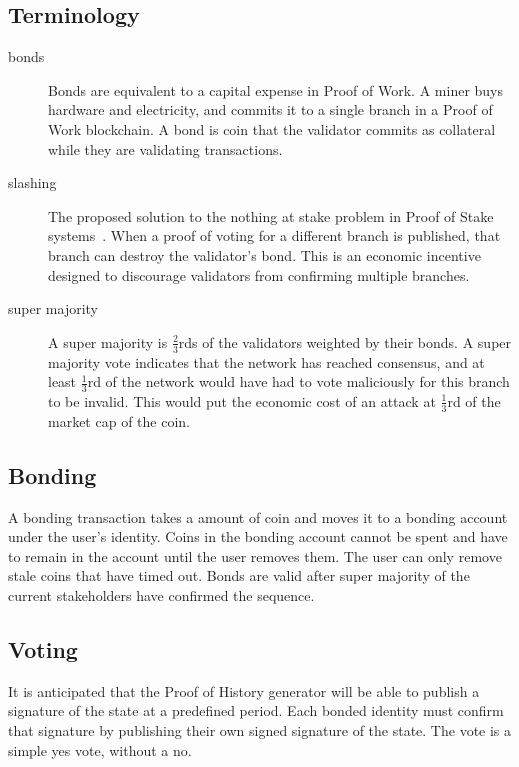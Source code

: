 \documentclass[12pt]{article}
\begin{document}
\subsection{Terminology}
\begin{description}

\item[bonds]
Bonds are equivalent to a capital expense in Proof of Work. A miner buys hardware and electricity, and commits it to a single branch in a Proof of Work blockchain. A bond is coin that the validator commits as collateral while they are validating transactions.

\item[slashing]

The proposed solution to the nothing at stake problem in Proof of Stake systems~\cite{slasher}. When a proof of voting for a different branch is published, that branch can destroy the validator’s bond. This is an economic incentive designed to discourage validators from confirming multiple branches.
\item[super majority]
A super majority is \(\frac{2}{3}\)rds of the validators weighted by their bonds. A super majority vote indicates that the network has reached consensus, and at least \(\frac{1}{3}\)rd of the network would have had to vote maliciously for this branch to be invalid. This would put the economic cost of an attack at \(\frac{1}{3}\)rd of the market cap of the coin.

\end{description}

\subsection{Bonding}
A bonding transaction takes a  amount of coin and moves it to a bonding account under the user’s identity. Coins in the bonding account cannot be spent and have to remain in the account until the user removes them. The user can only remove stale coins that have timed out. Bonds are valid after super majority of the current stakeholders have confirmed the sequence.

\subsection{Voting}
It is anticipated that the Proof of History generator will be able to publish a signature of the state at a predefined period. Each bonded identity must confirm that signature by publishing their own signed signature of the state. The vote is a simple yes vote, without a no.
\end{document}
